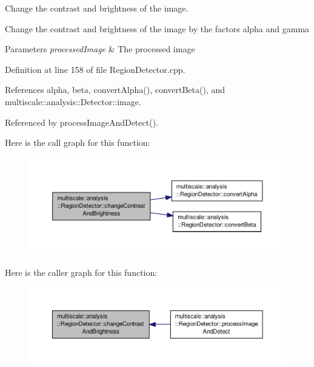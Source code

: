 Change the contrast and brightness of the image. 

Change the contrast and brightness of the image by the factors alpha and gamma


\begin{DoxyParams}{Parameters}
{\em processed\-Image} & The processed image \\
\hline
\end{DoxyParams}


Definition at line 158 of file Region\-Detector.\-cpp.



References alpha, beta, convert\-Alpha(), convert\-Beta(), and multiscale\-::analysis\-::\-Detector\-::image.



Referenced by process\-Image\-And\-Detect().



Here is the call graph for this function\-:
\nopagebreak
\begin{figure}[H]
\begin{center}
\leavevmode
\includegraphics[width=350pt]{classmultiscale_1_1analysis_1_1RegionDetector_a92260dc64fb1de8f72df3a7bd44e171d_cgraph}
\end{center}
\end{figure}




Here is the caller graph for this function\-:
\nopagebreak
\begin{figure}[H]
\begin{center}
\leavevmode
\includegraphics[width=350pt]{classmultiscale_1_1analysis_1_1RegionDetector_a92260dc64fb1de8f72df3a7bd44e171d_icgraph}
\end{center}
\end{figure}


